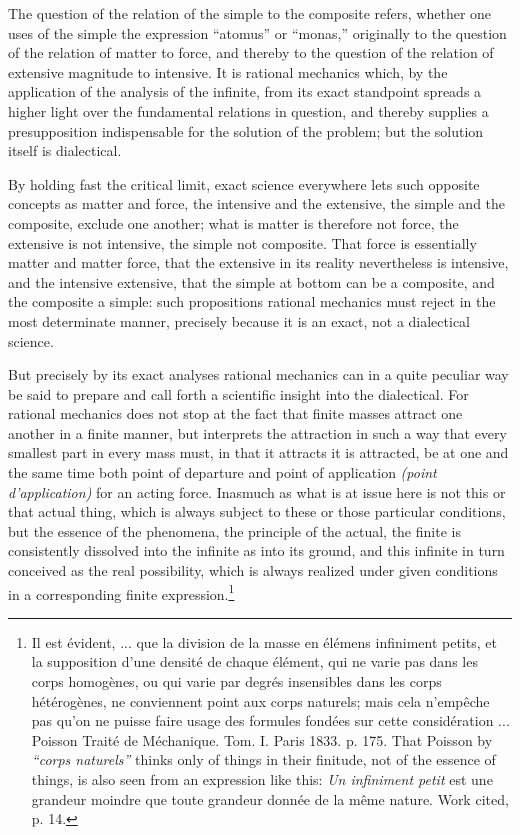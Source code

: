 \documentclass[12pt,a4paper,openany]{book}
\newcommand{\opage}[1]{\marginnote{\footnotesize\textit{[#1]}}}
\begin{document}
\setcounter{footnote}{0}%
\opage{127}The question of the relation of the simple to the composite
refers, whether one uses of the simple
the expression ``atomus'' or ``monas,'' originally to
the question of the relation of matter to force, and thereby
to the question of the relation of extensive magnitude
to intensive. It is rational mechanics which, by
the application of the analysis of the infinite, from its exact standpoint
spreads a higher light over the fundamental relations in question,
and thereby supplies a presupposition indispensable for the solution of the problem;
but the solution itself is dialectical.

By holding fast the critical limit, exact
science everywhere lets such opposite concepts as matter
and force, the intensive and the extensive, the simple and
the composite, exclude one another; what is matter
is therefore not force, the extensive is not intensive, the simple
not composite. That force is essentially matter and
matter force, that the extensive in its reality nevertheless
is intensive, and the intensive extensive, that the simple
at bottom can be a composite, and the composite a
simple: such propositions rational mechanics must reject in
the most determinate manner, precisely because it is an exact, not a
dialectical science.

But precisely by its exact analyses rational
mechanics can in a quite peculiar way be said to prepare
and call forth a scientific insight into the dialectical.
For rational mechanics does not stop
at the fact that finite masses attract one another in a finite
manner, but interprets the attraction in such a way
that every smallest part in every mass must, in that it attracts
it is attracted, be at one and the same time both point of departure
and point of application \textit{(point d'application)} for an acting force.
Inasmuch as what is at issue here is not this or that actual thing,
which is always subject to these or those particular conditions,
but the essence of the phenomena, the principle of the actual,
the finite is consistently dissolved into the infinite
\setcounter{footnote}{0}%
\opage{128}as into its ground, and this infinite in turn conceived as
the real possibility, which is always realized under given conditions
in a corresponding finite expression.\footnote[1]{Il est évident, ... que la division de la masse en élémens infiniment petits, et la supposition d'une densité de chaque élément, qui ne varie pas dans les corps homogènes, ou qui varie par degrés insensibles dans les corps hétérogènes, ne conviennent point aux corps naturels; mais cela n'empêche pas qu'on ne puisse faire usage des formules fondées sur cette considération ... Poisson Traité de Méchanique. Tom. I. Paris 1833. p. 175. That Poisson by \textit{``corps naturels''} thinks only of things in their finitude, not of the essence of things, is also seen from an expression like this: \emph{Un infiniment petit} est une grandeur moindre que toute grandeur donnée de la même nature. Work cited, p. 14.}
\end{document}
